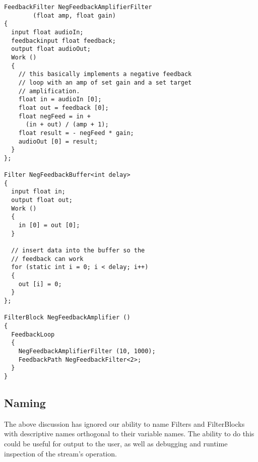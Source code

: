 \documentclass[draft]{article}
\begin{document}
\begin{verbatim}
FeedbackFilter NegFeedbackAmplifierFilter
        (float amp, float gain)
{
  input float audioIn;
  feedbackinput float feedback;
  output float audioOut;
  Work ()
  {
    // this basically implements a negative feedback
    // loop with an amp of set gain and a set target
    // amplification.
    float in = audioIn [0];
    float out = feedback [0];
    float negFeed = in + 
      (in + out) / (amp + 1);
    float result = - negFeed * gain;
    audioOut [0] = result;
  }
};

Filter NegFeedbackBuffer<int delay>
{
  input float in;
  output float out;
  Work ()
  {
    in [0] = out [0];
  }

  // insert data into the buffer so the
  // feedback can work
  for (static int i = 0; i < delay; i++)
  {
    out [i] = 0;
  }
};

FilterBlock NegFeedbackAmplifier ()
{
  FeedbackLoop
  {
    NegFeedbackAmplifierFilter (10, 1000);
    FeedbackPath NegFeedbackFilter<2>;
  }
}
\end{verbatim}

\begin{comment}

\end{comment}

\begin{comment}

\begin{figure}[t]
\centerline{\psfig{figure=block.ps}}
\vspace{-24pt}
\caption{\protect\small The block construct.}
\end{figure}

\section{old stuff}

\begin{lgrind}

\end{lgrind}

\end{comment}

\subsection{Naming}

The above discussion has ignored our ability to name Filters and
FilterBlocks with descriptive names orthogonal to their variable
names.  The ability to do this could be useful for output to the user,
as well as debugging and runtime inspection of the stream's operation.
\end{document}

